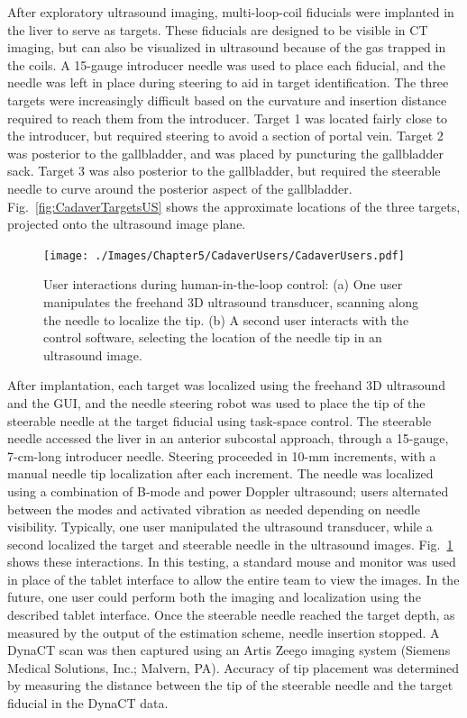 After exploratory ultrasound imaging, multi-loop-coil fiducials were implanted in the liver to serve as targets. These fiducials are designed to be visible in CT imaging, but can also be visualized in ultrasound because of the gas trapped in the coils. A 15-gauge introducer needle was used to place each fiducial, and the needle was left in place during steering to aid in target identification. The three targets were increasingly difficult based on the curvature and insertion distance required to reach them from the introducer. Target 1 was located fairly close to the introducer, but required steering to avoid a section of portal vein. Target 2 was posterior to the gallbladder, and was placed by puncturing the gallbladder sack. Target 3 was also posterior to the gallbladder, but required the steerable needle to curve around the posterior aspect of the gallbladder. Fig.~\ref{fig:CadaverTargetsUS} shows the approximate locations of the three targets, projected onto the ultrasound image plane.

\begin{figure}[!t]
\centering
\texttt{[image: ./Images/Chapter5/CadaverUsers/CadaverUsers.pdf]}%
\caption[User interactions during human-in-the-loop control]{User interactions during human-in-the-loop control: (a) One user manipulates the freehand 3D ultrasound transducer, scanning along the needle to localize the tip. (b) A second user interacts with the control software, selecting the location of the needle tip in an ultrasound image. }
\label{fig:CadaverUsers}
\end{figure} 

After implantation, each target was localized using the freehand 3D ultrasound and the GUI, and the needle steering robot was used to place the tip of the steerable needle at the target fiducial using task-space control. The steerable needle accessed the liver in an anterior subcostal approach, through a 15-gauge, 7-cm-long introducer needle. Steering proceeded in 10-mm increments, with a manual needle tip localization after each increment. The needle was localized using a combination of B-mode and power Doppler ultrasound; users alternated between the modes and activated vibration as needed depending on needle visibility. Typically, one user manipulated the ultrasound transducer, while a second localized the target and steerable needle in the ultrasound images. Fig.~\ref{fig:CadaverUsers} shows these interactions. In this testing, a standard mouse and monitor was used in place of the tablet interface to allow the entire team to view the images. In the future, one user could perform both the imaging and localization using the described tablet interface. Once the steerable needle reached the target depth, as measured by the output of the estimation scheme, needle insertion stopped. A DynaCT scan was then captured using an Artis Zeego imaging system (Siemens Medical Solutions, Inc.; Malvern, PA). Accuracy of tip placement was determined by measuring the distance between the tip of the steerable needle and the target fiducial in the DynaCT data.

